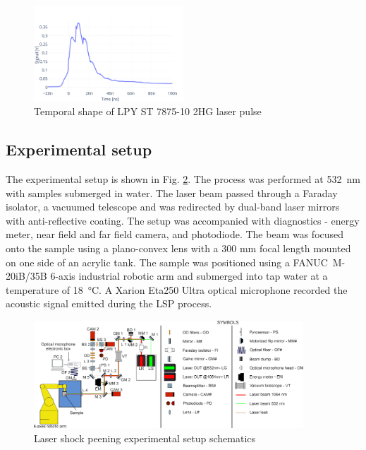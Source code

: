 \documentclass[sn-nature]{sn-jnl}%
\theoremstyle{thmstyleone}%
\theoremstyle{thmstyletwo}%
\theoremstyle{thmstylethree}%
\begin{document}

    \begin{figure}[h!]     
    \centering
    \includegraphics[width=0.5\textwidth]{temporal_profile_new.png}
    \caption{Temporal shape of LPY ST 7875-10 2HG laser pulse}
    \label{fig:temporal}
    \end{figure}


    \subsection{Experimental setup}

    The experimental setup is shown in Fig. \ref{fig:optical_setup}. The process was performed at \SI{532}{\nano\meter} with samples submerged in water. The laser beam passed through a Faraday isolator, a vacuumed telescope and was redirected by dual-band laser mirrors with anti-reflective coating. The setup was accompanied with diagnostics - energy meter, near field and far field camera, and photodiode. The beam was focused onto the sample using a plano-convex lens with a 300 mm focal length mounted on one side of an acrylic tank. The sample was positioned using a FANUC~M-20iB/35B 6-axis industrial robotic arm and submerged into tap water at a temperature of \SI{18}{\celsius}. A Xarion Eta250 Ultra optical microphone recorded the acoustic signal emitted during the LSP process.


    \begin{figure}[h]     
    \centering
    \includegraphics[width=0.9\textwidth]{optical setup.png}
    \caption{Laser shock peening experimental setup schematics}
    \label{fig:optical_setup}
    \end{figure}
\end{document}
